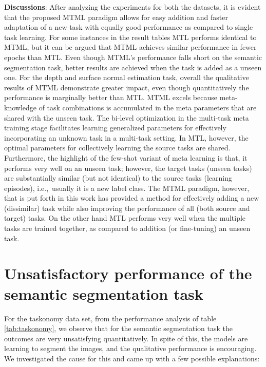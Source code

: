\documentclass[conference]{IEEEtran}
\newcommand*{\ie}		{i.e.,\ }
\begin{document}
\textbf{Discussions}: 
After analyzing the experiments for both the datasets, it is evident that the proposed \ac{MTML} paradigm allows for easy addition and faster adaptation of a new task with equally good performance as compared to single task learning. 
For some instances in the result tables \ac{MTL} performs identical to \ac{MTML}, but it can be argued that \ac{MTML} achieves similar performance in fewer epochs than \ac{MTL}.
Even though MTML's performance falls short on the semantic segmentation task, better results are achieved when the task is added as a unseen one.
For the depth and surface normal estimation task, overall the qualitative results of \ac{MTML} demonstrate greater impact, even though quantitatively the performance is marginally better than \ac{MTL}. 
\ac{MTML} excels because meta-knowledge of task combinations is accumulated in the meta parameters that are shared with the unseen task.
The bi-level optimization in the multi-task meta training stage facilitates learning generalized parameters for effectively incorporating an unknown task in a multi-task setting.
In \ac{MTL}, however, the optimal parameters for collectively learning the source tasks are shared.
Furthermore, the highlight of the few-shot variant of meta learning is that, it performs very well on an unseen task; however, the target tasks (unseen tasks) are substantially similar (but not identical) to the source tasks (learning episodes), \ie usually it is a new label class.
The \ac{MTML} paradigm, however, that is put forth in this work has provided a method for effectively adding a new (dissimilar) task  while also improving the performance of all (both source and target) tasks.
On the other hand \ac{MTL} performs very well when the multiple tasks are trained together, as compared to addition (or fine-tuning) an unseen task.

\section{Unsatisfactory performance of the semantic segmentation task} \label{seg_perform}
For the taskonomy data set, from the performance analysis of table \ref{tab:taskonomy}, we observe that for the semantic segmentation task the outcomes are very unsatisfying quantitatively.
In spite of this, the models are learning to segment the images, and the qualitative performance is encouraging.
We investigated the cause for this and came up with a few possible explanations:
\end{document}
